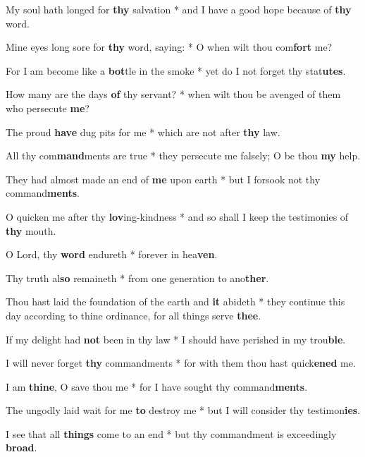 \begin{multicols}{2}
	My soul hath longed for \textbf{thy} salvation * and I have a good hope because of \textbf{thy} word.
	
	Mine eyes long sore for \textbf{thy} word, saying: * O when wilt thou com\textbf{fort} me?
	
	For I am become like a \textbf{bot}tle in the smoke * yet do I not forget thy stat\textbf{utes}.
	
	How many are the days \textbf{of} thy servant? * when wilt thou be avenged of them who persecute \textbf{me}?
	
	The proud \textbf{have} dug pits for me * which are not after \textbf{thy} law.
	
	All thy com\textbf{mand}ments are true * they persecute me falsely; O be thou \textbf{my} help.
	
	They had almost made an end of \textbf{me} upon earth * but I forsook not thy command\textbf{ments}.
	
	O quicken me after thy \textbf{lov}ing-kindness * and so shall I keep the testimonies of \textbf{thy} mouth.
	
	O Lord, thy \textbf{word} endureth * forever in hea\textbf{ven}.
	
	Thy truth al\textbf{so} remaineth * from one generation to ano\textbf{ther}.
	
	Thou hast laid the foundation of the earth and \textbf{it} abideth * they continue this day according to thine ordinance, for all things serve \textbf{thee}.
	
	If my delight had \textbf{not} been in thy law * I should have perished in my trou\textbf{ble}.
	
	I will never forget \textbf{thy} commandments * for with them thou hast quick\textbf{ened} me.
	
	I am \textbf{thine}, O save thou me * for I have sought thy command\textbf{ments}.
	
	The ungodly laid wait for me \textbf{to} destroy me * but I will consider thy testimon\textbf{ies}.
	
	I see that all \textbf{things} come to an end * but thy commandment is exceedingly \textbf{broad}.
\end{multicols}